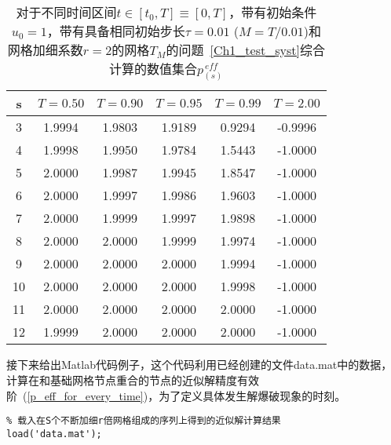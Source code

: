 \documentclass[twoside]{book}
\begin{document}
\begin{CJK*}{GBK}{song}
\begin{table}[t]
    \label{Table_1_2}
    \begin{center}
        \begin{tabular}{c||c|c|c|c|c}
            s & $T = 0.50$ & $T = 0.90$ & $T = 0.95$ & $T = 0.99$ & $T = 2.00$ \\
            \hline\hline
            3 & 1.9994 & 1.9803 & 1.9189 & 0.9294 & -0.9996 \\
            4 & 1.9998 & 1.9950 & 1.9784 & 1.5443 & -1.0000 \\
            5 & 2.0000 & 1.9987 & 1.9945 & 1.8547 & -1.0000 \\
            6 & 2.0000 & 1.9997 & 1.9986 & 1.9603 & -1.0000 \\
            7 & 2.0000 & 1.9999 & 1.9997 & 1.9898 & -1.0000 \\
            8 & 2.0000 & 2.0000 & 1.9999 & 1.9974 & -1.0000 \\
            9 & 2.0000 & 2.0000 & 2.0000 & 1.9994 & -1.0000 \\
            10 & 2.0000 & 2.0000 & 2.0000 & 1.9998 & -1.0000 \\
            11 & 2.0000 & 2.0000 & 2.0000 & 2.0000 & -1.0000 \\
            12 & 1.9999 & 2.0000 & 2.0000 & 2.0000 & -1.0000 \\
        \end{tabular}
    \end{center}
	\caption{对于不同时间区间$t \in [t_0,T] \equiv [0,T]$，带有初始条件$u_0 = 1$，带有具备相同初始步长$\tau = 0.01$ ($M = T/0.01$)和网格加细系数$r = 2$的网格$T_M$的问题~\eqref{Ch1_test_syst}综合计算的数值集合$p^{\, eff}_{(s)}$}
\end{table}



接下来给出Matlab代码例子，这个代码利用已经创建的文件data.mat中的数据，计算在和基础网格节点重合的节点的近似解精度有效阶~(\ref{p_eff_for_every_time})，为了定义具体发生解爆破现象的时刻。


\newpage
%
\begin{lstlisting}
% 载入在S个不断加细r倍网格组成的序列上得到的近似解计算结果
load('data.mat');


\end{lstlisting}
\end{CJK*}
\end{document}
